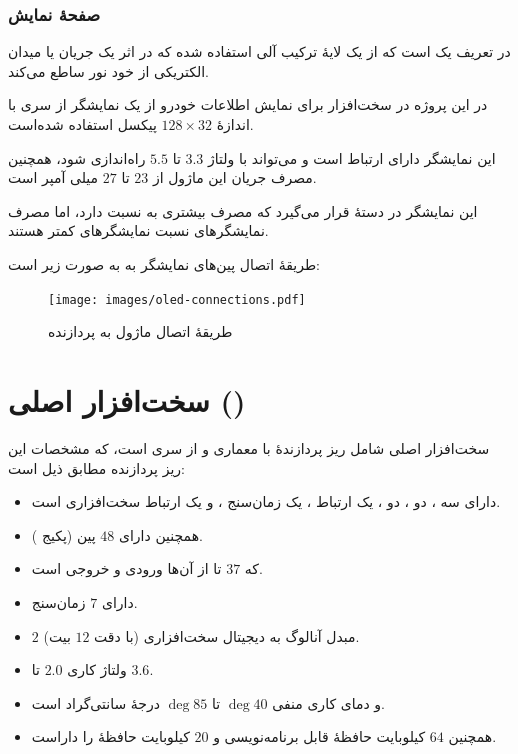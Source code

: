 \subsubsection{صفحهٔ نمایش }\label{subsubsec3:subsec1:sec1:chap5}

در تعریف
 یک  است که از یک لایهٔ
ترکیب آلی استفاده شده که در اثر یک جریان یا میدان الکتریکی از خود نور ساطع می‌کند.

در این پروژه در سخت‌افزار  برای نمایش اطلاعات خودرو از یک نمایشگر  از سری
 با اندازهٔ
$128\times32$
  پیکسل استفاده شده‌است.

این نمایشگر دارای ارتباط
 است و می‌تواند با ولتاژ $3.3$ تا $5.5$ راه‌اندازی شود، همچنین مصرف جریان این ماژول از $23$ تا $27$ میلی آمپر است.

این نمایشگر در دستهٔ
 قرار می‌گیرد که مصرف بیشتری به نسبت
 دارد، اما مصرف نمایشگر‌های  نسبت نمایشگر‌های  کمتر هستند.
\cite{OrganicE14:online}

طریقهٔ اتصال پین‌های نمایشگر به
به صورت زیر است:

\begin{figure}[!h]
	\begin{center}
		\texttt{[image: images/oled-connections.pdf]}
	\end{center}
	\caption{طریقهٔ اتصال ماژول  به پردازنده}
	\label{fig1:sec1:chap5}
\end{figure}

\section{سخت‌افزار اصلی ()}\label{sec2:chap5}

سخت‌افزار اصلی شامل ریز پردازندهٔ  با معماری  و از سری  است، که مشخصات این ریز پردازنده مطابق ذیل است:

\begin{itemize}[nosep]
    \item دارای سه ، دو ، دو ، یک ارتباط ، یک زمان‌سنج  ، و یک ارتباط سخت‌افزاری  است.
    \item همچنین دارای $48$ پین (پکیج ).
    \item که $37$ تا از آن‌ها ورودی و خروجی است.
    \item دارای $7$ زمان‌سنج.
    \item $2$ مبدل آنالوگ به دیجیتال سخت‌افزاری (با دقت $12$ بیت).
    \item ولتاژ کاری $2.0$ تا $3.6$.
    \item
    و دمای کاری منفی $40$$\deg$ تا $85$$\deg$ درجهٔ سانتی‌گراد است.
    \item همچنین $64$ کیلوبایت حافظهٔ قابل برنامه‌نویسی  و $20$ کیلوبایت حافظهٔ
 را داراست.
\end{itemize}

